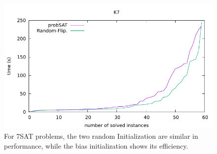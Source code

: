 \documentclass[12pt,a4paper,twoside]{scrartcl}
\numberwithin{equation}{section}
\begin{document}
  \begin{figure}[H]
\begin{center}
  \includegraphics[scale = 1]{DATA/K7/e4r.pdf}
  \end{center}
  \caption{For 7SAT problems, the two random Initialization are similar in performance, while the bias initialization shows its efficiency.}
  \label{Experiment 7 k7-w cactus plot}
  \end{figure} 
\end{document}
